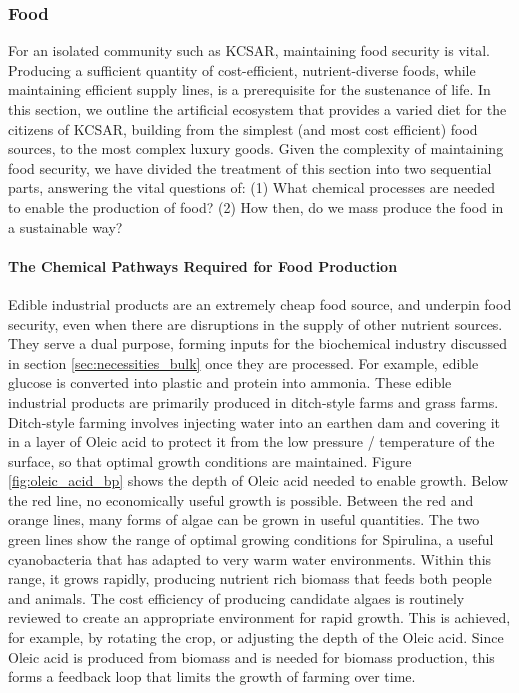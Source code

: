 \documentclass[fleqn,10pt]{Stylesheet} %
\begin{document}
\subsubsection{Food}
\label{sec:necessities_food}
 
For an isolated community such as KCSAR, maintaining food security is vital. Producing a sufficient quantity of cost-efficient, nutrient-diverse foods, while maintaining efficient supply lines, is a prerequisite for the sustenance of life. In this section, we outline the artificial ecosystem that provides a varied diet for the citizens of KCSAR, building from the simplest (and most cost efficient) food sources, to the most complex luxury goods. Given the complexity of maintaining food security, we have divided the treatment of this section into two sequential parts, answering the vital questions of: (1) What chemical processes are needed to enable the production of food? (2) How then, do we mass produce the food in a sustainable way?

\paragraph{The Chemical Pathways Required for Food Production}

Edible industrial products are an extremely cheap food source, and underpin food security, even when there are disruptions in the supply of other nutrient sources. They serve a dual purpose, forming inputs for the biochemical industry discussed in section \ref{sec:necessities_bulk} once they are processed. For example, edible glucose is converted into plastic and protein into ammonia. These edible industrial products are primarily produced in ditch-style farms and grass farms. Ditch-style farming involves injecting water into an earthen dam and covering it in a layer of Oleic acid to protect it from the low pressure / temperature of the surface, so that optimal growth conditions are maintained. Figure \ref{fig:oleic_acid_bp} shows the depth of Oleic acid needed to enable growth. Below the red line, no economically useful growth is possible. Between the red and orange lines, many forms of algae can be grown in useful quantities. The two green lines show the range of optimal growing conditions for Spirulina, a useful cyanobacteria that has adapted to very warm water environments. Within this range, it grows rapidly, producing nutrient rich biomass that feeds both people and animals. The cost efficiency of producing candidate algaes is routinely reviewed to create an appropriate environment for rapid growth. This is achieved, for example, by rotating the crop, or adjusting the depth of the Oleic acid. Since Oleic acid is produced from biomass and is needed for biomass production, this forms a feedback loop that limits the growth of farming over time.
\end{document}
